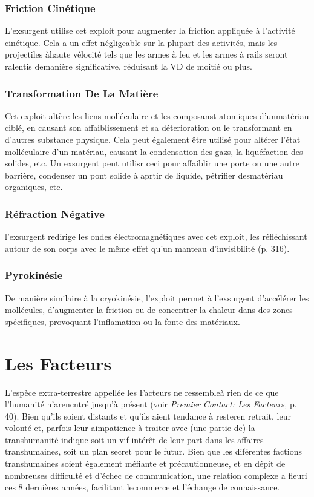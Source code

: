 \subsubsection{Friction Cinétique} 

L'exsurgent utilise cet exploit pour augmenter la friction appliquée à l'activité cinétique. Cela a un effet négligeable sur la plupart des activités, mais les projectiles àhaute vélocité tels que les armes à feu et les armes à rails seront ralentis demanière significative, réduisant la VD de moitié ou plus. 

\subsubsection{Transformation De La Matière} 

Cet exploit altère les liens molléculaire et les composanst atomiques d'unmatériau ciblé, en causant son affaiblissement et sa déterioration ou le transformant en d'autres substance physique. Cela peut également être utilisé pour altérer l'état molléculaire d'un matériau, causant la condensation des gazs, la liquéfaction des solides, etc. Un exsurgent peut utilisr ceci pour affaiblir une porte ou une autre barrière, condenser un pont solide à aprtir de liquide, pétrifier desmatériau organiques, etc. 

\subsubsection{Réfraction Négative} 

l'exsurgent redirige les ondes électromagnétiques avec cet exploit, les réfléchissant autour de son corps avec le même effet qu'un manteau d'invisibilité (p. 316). 

\subsubsection{Pyrokinésie} 

De manière similaire à la cryokinésie, l'exploit permet à l'exsurgent d'accélérer les mollécules, d'augmenter la friction ou de concentrer la chaleur dans des zones spécifiques, provoquant l'inflamation ou la fonte des matériaux. 

\section{Les Facteurs } 

L'espèce extra-terrestre appellée les Facteurs ne ressembleà rien de ce que l'humanité n'arencntré jusqu'à présent (voir \textit{Premier} \textit{Contact: Les Facteurs,} p. 40). Bien qu'ils soient distants et qu'ils aient tendance à resteren retrait, leur volonté et, parfois leur aimpatience à traiter avec (une partie de) la transhumanité indique soit un vif intérêt de leur part dans les affaires transhumaines, soit un plan secret pour le futur. Bien que les diférentes factions transhumaines soient également méfiante et précautionneuse, et en dépit de nombreuses difficulté et d'échec de communication, une relation complexe a fleuri ces 8 dernières années, facilitant lecommerce et l'échange de connaissance. 


